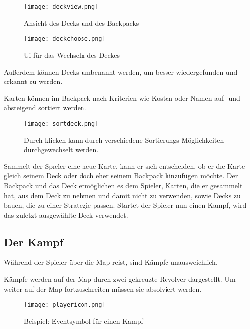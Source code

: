 \begin{figure}[H]
    \texttt{[image: deckview.png]}
    \caption{Ansicht des Decks und des Backpacks}
\end{figure}

\begin{figure}[H]
    \texttt{[image: deckchoose.png]}
    \caption{Ui für das Wechseln des Deckes}
\end{figure}


Außerdem können Decks umbenannt werden, um besser wiedergefunden und erkannt zu werden.

Karten können im Backpack nach Kriterien wie Kosten oder Namen auf- und absteigend sortiert werden.

\begin{figure}[H]
    \texttt{[image: sortdeck.png]}
    \caption{Durch klicken kann durch verschiedene Sortierungs-Möglichkeiten durchgewechselt werden.}
\end{figure}

Sammelt der Spieler eine neue Karte, kann er sich entscheiden, ob er die Karte gleich seinem Deck oder doch eher seinem
Backpack hinzufügen möchte.
Der Backpack und das Deck ermöglichen es dem Spieler, Karten, die er gesammelt hat, aus dem Deck zu nehmen und damit
nicht zu verwenden, sowie Decks zu bauen, die zu einer Strategie passen.
Startet der Spieler nun einen Kampf, wird das zuletzt ausgewählte Deck verwendet.


\subsection{Der Kampf}\label{backpack_and_deck}

Während der Spieler über die Map reist, sind Kämpfe unausweichlich.


Kämpfe werden auf der Map durch zwei gekreuzte Revolver dargestellt. Um weiter auf der Map fortzuschreiten müssen sie absolviert werden.

\begin{figure}[H]
    \texttt{[image: playericon.png]}
    \caption{Beispiel: Eventsymbol für einen Kampf}
\end{figure}

